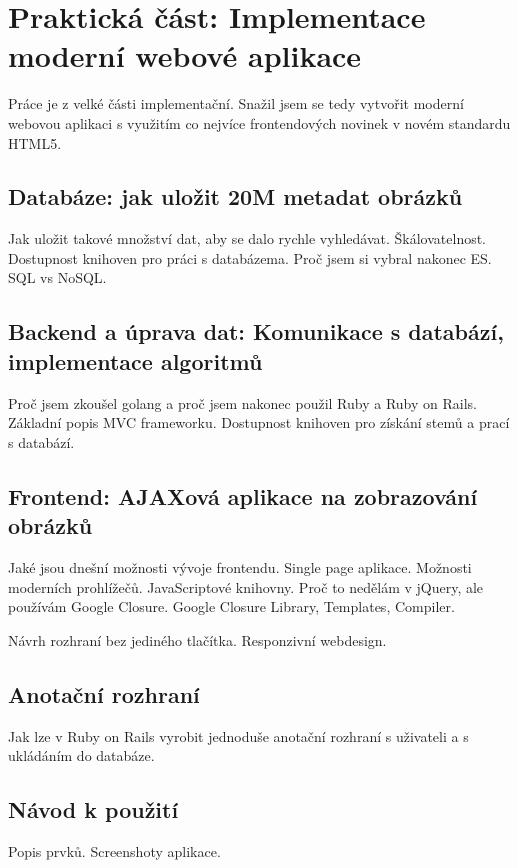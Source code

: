 \chapter{Praktická část: Implementace moderní webové aplikace}

Práce je z velké části implementační. Snažil jsem se tedy vytvořit moderní webovou aplikaci s využitím co nejvíce frontendových novinek v novém standardu HTML5.

\section{Databáze: jak uložit 20M metadat obrázků}

Jak uložit takové množství dat, aby se dalo rychle vyhledávat. Škálovatelnost. Dostupnost knihoven pro práci s databázema. Proč jsem si vybral nakonec ES. SQL vs NoSQL.

\section{Backend a úprava dat: Komunikace s databází, implementace algoritmů}

Proč jsem zkoušel golang a proč jsem nakonec použil Ruby a Ruby on Rails. Základní popis MVC frameworku. Dostupnost knihoven pro získání stemů a prací s databází.

\section{Frontend: AJAXová aplikace na zobrazování obrázků}

Jaké jsou dnešní možnosti vývoje frontendu. Single page aplikace. Možnosti moderních prohlížečů. JavaScriptové knihovny. Proč to nedělám v jQuery, ale používám Google Closure. Google Closure Library, Templates, Compiler.

Návrh rozhraní bez jediného tlačítka. Responzivní webdesign.

\section{Anotační rozhraní}

Jak lze v Ruby on Rails vyrobit jednoduše anotační rozhraní s uživateli a s ukládáním do databáze.

\section{Návod k použití}

Popis prvků. Screenshoty aplikace.

